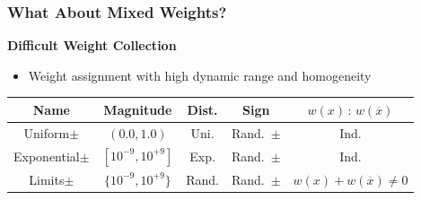 \documentclass[t,pdf]{beamer}
\newcommand{\obar}[1]{\overline{#1}}
\newcommand{\rtext}[1]{\textcolor{xred}{#1}}
\begin{document}
\begin{frame}
  \frametitle{What About Mixed Weights?}

\medskip

  \textbf{Difficult Weight Collection}

\medskip

  \begin{itemize}
  \item
    Weight assignment with high dynamic range and homogeneity
  \end{itemize}

\medskip

\begin{center}
   \begin{tabular}{ccccc}
     Name & Magnitude  & Dist. & Sign & $w(x)\,:\,w(\obar{x})$ \\
     \midrule
     Uniform$\pm$      & $(0.0, 1.0)$     & Uni.  & Rand.~$\pm$   & Ind. \\[0.5em]
     Exponential$\pm$ & $[10^{-9}, 10^{+9}]$ & Exp. & Rand.~$\pm$ & Ind. \\[0.5em]
     \rtext{Limits$\pm$} & \rtext{$\{10^{-9}, 10^{+9}\}$} & \rtext{Rand.} & \rtext{Rand.~$\pm$} & \rtext{$w(x) + w(\obar{x}) \not = 0$} \\
   \end{tabular}
\end{center}

\medskip


\end{frame}
\end{document}
